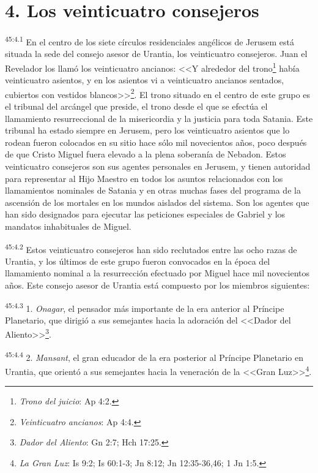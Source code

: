 \section*{4. Los veinticuatro consejeros}
\par
\textsuperscript{45:4.1} En el centro de los siete círculos residenciales angélicos de Jerusem está situada la sede del consejo asesor de Urantia, los veinticuatro consejeros. Juan el Revelador los llamó los veinticuatro ancianos: <<Y alrededor del trono\footnote{\textit{Trono del juicio}: Ap 4:2.} había veinticuatro asientos, y en los asientos vi a veinticuatro ancianos sentados, cubiertos con vestidos blancos>>\footnote{\textit{Veinticuatro ancianos}: Ap 4:4.}. El trono situado en el centro de este grupo es el tribunal del arcángel que preside, el trono desde el que se efectúa el llamamiento resurreccional de la misericordia y la justicia para toda Satania. Este tribunal ha estado siempre en Jerusem, pero los veinticuatro asientos que lo rodean fueron colocados en su sitio hace sólo mil novecientos años, poco después de que Cristo Miguel fuera elevado a la plena soberanía de Nebadon. Estos veinticuatro consejeros son sus agentes personales en Jerusem, y tienen autoridad para representar al Hijo Maestro en todos los asuntos relacionados con los llamamientos nominales de Satania y en otras muchas fases del programa de la ascensión de los mortales en los mundos aislados del sistema. Son los agentes que han sido designados para ejecutar las peticiones especiales de Gabriel y los mandatos inhabituales de Miguel.

\par
\textsuperscript{45:4.2} Estos veinticuatro consejeros han sido reclutados entre las ocho razas de Urantia, y los últimos de este grupo fueron convocados en la época del llamamiento nominal a la resurrección efectuado por Miguel hace mil novecientos años. Este consejo asesor de Urantia está compuesto por los miembros siguientes:

\par
\textsuperscript{45:4.3} 1. \textit{Onagar}, el pensador más importante de la era anterior al Príncipe Planetario, que dirigió a sus semejantes hacia la adoración del <<Dador del Aliento>>\footnote{\textit{Dador del Aliento}: Gn 2:7; Hch 17:25.}.

\par
\textsuperscript{45:4.4} 2. \textit{Mansant}, el gran educador de la era posterior al Príncipe Planetario en Urantia, que orientó a sus semejantes hacia la veneración de la <<Gran Luz>>\footnote{\textit{La Gran Luz}: Is 9:2; Is 60:1-3; Jn 8:12; Jn 12:35-36,46; 1 Jn 1:5.}.

